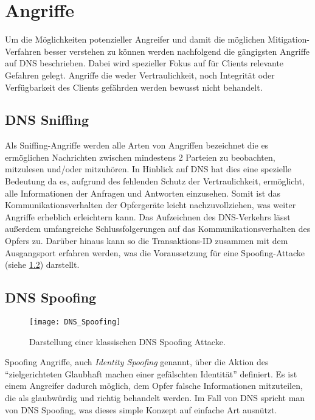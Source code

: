 \chapter{Angriffe}
\label{chap:attacks}
Um die Möglichkeiten potenzieller Angreifer und damit die möglichen Mitigation-Verfahren besser verstehen zu können werden nachfolgend die gängigsten Angriffe auf DNS beschrieben. Dabei wird spezieller Fokus auf für Clients relevante Gefahren gelegt. Angriffe die weder Vertraulichkeit, noch Integrität oder Verfügbarkeit des Clients gefährden werden bewusst nicht behandelt.

\section{DNS Sniffing}
\label{sec:attacks-dnssniffing}
Als Sniffing-Angriffe werden alle Arten von Angriffen bezeichnet die es ermöglichen Nachrichten zwischen mindestens 2 Parteien zu beobachten, mitzulesen und/oder mitzuhören\cite{CAPEC157}. In Hinblick auf DNS hat dies eine spezielle Bedeutung da es, aufgrund des fehlenden Schutz der Vertraulichkeit, ermöglicht, alle Informationen der Anfragen und Antworten einzusehen. Somit ist das Kommunikationsverhalten der Opfergeräte leicht nachzuvollziehen, was weiter Angriffe erheblich erleichtern kann. Das Aufzeichnen des DNS-Verkehrs lässt außerdem umfangreiche Schlussfolgerungen auf das Kommunikationsverhalten des Opfers zu. Darüber hinaus kann so die Transaktions-ID zusammen mit dem Ausgangsport erfahren werden, was die Voraussetzung für eine Spoofing-Attacke (siehe \ref{sec:attacks-dnsspoofing}) darstellt. 

\section{DNS Spoofing}
\label{sec:attacks-dnsspoofing}
\begin{wrapfigure}{r}{0.5\textwidth}
    \begin{center}
        \texttt{[image: DNS\_Spoofing]}
    \end{center}
    \caption{Darstellung einer klassischen DNS Spoofing Attacke.}
    \label{img:dnsspoofing}
\end{wrapfigure}

Spoofing Angriffe, auch \textit{Identity Spoofing} genannt, über die Aktion des ``zielgerichteten Glaubhaft machen einer gefälschten Identität'' definiert\cite{CAPEC151}. Es ist einem Angreifer dadurch möglich, dem Opfer falsche Informationen mitzuteilen, die als glaubwürdig und richtig behandelt werden. Im Fall von DNS spricht man von DNS Spoofing, was dieses simple Konzept auf einfache Art ausnützt.

